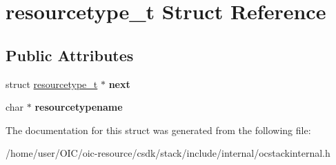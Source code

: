 \hypertarget{structresourcetype__t}{}\section{resourcetype\+\_\+t Struct Reference}
\label{structresourcetype__t}
\subsection*{Public Attributes}
\begin{DoxyCompactItemize}
\item 
\hypertarget{structresourcetype__t_a3dad8f15c706158f6670ba26cc47433b}{}struct \hyperlink{structresourcetype__t}{resourcetype\+\_\+t} $\ast$ {\bfseries next}\label{structresourcetype__t_a3dad8f15c706158f6670ba26cc47433b}

\item 
\hypertarget{structresourcetype__t_a87e845f88e0564e12d0cdcdce9cc4ea8}{}char $\ast$ {\bfseries resourcetypename}\label{structresourcetype__t_a87e845f88e0564e12d0cdcdce9cc4ea8}

\end{DoxyCompactItemize}


The documentation for this struct was generated from the following file\+:\begin{DoxyCompactItemize}
\item 
/home/user/\+O\+I\+C/oic-\/resource/csdk/stack/include/internal/ocstackinternal.\+h\end{DoxyCompactItemize}
